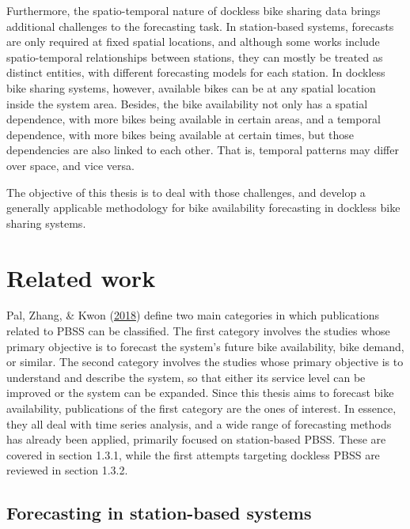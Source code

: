 \documentclass[12pt,oneside]{reedthesis}
\begin{document}
Furthermore, the spatio-temporal nature of dockless bike sharing data
brings additional challenges to the forecasting task. In station-based
systems, forecasts are only required at fixed spatial locations, and
although some works include spatio-temporal relationships between
stations, they can mostly be treated as distinct entities, with
different forecasting models for each station. In dockless bike sharing
systems, however, available bikes can be at any spatial location inside
the system area. Besides, the bike availability not only has a spatial
dependence, with more bikes being available in certain areas, and a
temporal dependence, with more bikes being available at certain times,
but those dependencies are also linked to each other. That is, temporal
patterns may differ over space, and vice versa.

The objective of this thesis is to deal with those challenges, and
develop a generally applicable methodology for bike availability
forecasting in dockless bike sharing systems.

\section{Related work}\label{related-work}

Pal, Zhang, \& Kwon (\protect\hyperlink{ref-pal2018}{2018}) define two
main categories in which publications related to PBSS can be classified.
The first category involves the studies whose primary objective is to
forecast the system's future bike availability, bike demand, or similar.
The second category involves the studies whose primary objective is to
understand and describe the system, so that either its service level can
be improved or the system can be expanded. Since this thesis aims to
forecast bike availability, publications of the first category are the
ones of interest. In essence, they all deal with time series analysis,
and a wide range of forecasting methods has already been applied,
primarily focused on station-based PBSS. These are covered in section
1.3.1, while the first attempts targeting dockless PBSS are reviewed in
section 1.3.2.

\subsection{Forecasting in station-based
systems}\label{forecasting-in-station-based-systems}
\end{document}
